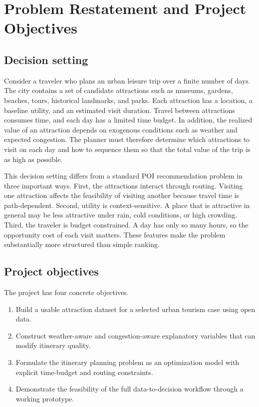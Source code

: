 \documentclass[12pt,a4paper]{article}
\begin{document}
\section{Problem Restatement and Project Objectives}

\subsection{Decision setting}

Consider a traveler who plans an urban leisure trip over a finite number of days. The city contains a set of candidate attractions such as museums, gardens, beaches, tours, historical landmarks, and parks. Each attraction has a location, a baseline utility, and an estimated visit duration. Travel between attractions consumes time, and each day has a limited time budget. In addition, the realized value of an attraction depends on exogenous conditions such as weather and expected congestion. The planner must therefore determine which attractions to visit on each day and how to sequence them so that the total value of the trip is as high as possible.

This decision setting differs from a standard POI recommendation problem in three important ways. First, the attractions interact through routing. Visiting one attraction affects the feasibility of visiting another because travel time is path-dependent. Second, utility is context-sensitive. A place that is attractive in general may be less attractive under rain, cold conditions, or high crowding. Third, the traveler is budget constrained. A day has only so many hours, so the opportunity cost of each visit matters. These features make the problem substantially more structured than simple ranking.

\subsection{Project objectives}

The project has four concrete objectives.

\begin{enumerate}[leftmargin=2em]
    \item Build a usable attraction dataset for a selected urban tourism case using open data.
    \item Construct weather-aware and congestion-aware explanatory variables that can modify itinerary quality.
    \item Formulate the itinerary planning problem as an optimization model with explicit time-budget and routing constraints.
    \item Demonstrate the feasibility of the full data-to-decision workflow through a working prototype.
\end{enumerate}
\end{document}

